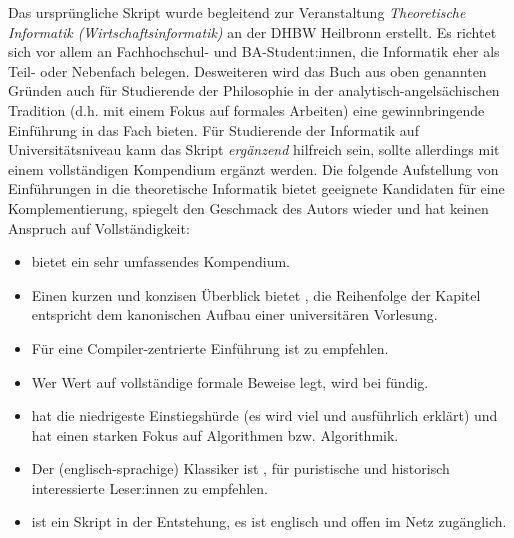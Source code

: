 Das ursprüngliche Skript wurde begleitend zur Veranstaltung
\emph{Theoretische Informatik (Wirtschaftsinformatik)}
an der DHBW Heilbronn erstellt.
Es richtet sich vor allem an Fachhochschul- und BA-Student:innen,
die Informatik eher als Teil- oder Nebenfach belegen.
Desweiteren wird das Buch aus oben genannten Gründen auch für Studierende der Philosophie
in der analytisch-angelsächischen Tradition (d.h. mit einem Fokus auf formales Arbeiten)
eine gewinnbringende Einführung in das Fach bieten.
Für Studierende der Informatik auf Universitätsniveau kann das Skript 
\emph{ergänzend} hilfreich sein,
sollte allerdings mit einem vollständigen Kompendium ergänzt werden.
Die folgende Aufstellung von Einführungen in die theoretische Informatik
bietet geeignete Kandidaten für eine Komplementierung, 
spiegelt den Geschmack des Autors wieder
und hat keinen Anspruch auf Vollständigkeit:
\begin{itemize}
    \item  \cite{hoffmann} bietet ein sehr umfassendes Kompendium.
    \item  Einen kurzen und konzisen Überblick bietet \cite{schoening},
            die Reihenfolge der Kapitel entspricht dem kanonischen Aufbau
            einer universitären Vorlesung.
    \item  Für eine Compiler-zentrierte Einführung ist \cite{hedtstueck}
           zu empfehlen.
    \item  Wer Wert auf vollständige formale Beweise legt,
        wird bei \cite{erkpriese} fündig.
    \item  \cite{neubert} hat die niedrigeste Einstiegshürde (es wird viel und ausführlich erklärt) und hat einen starken Fokus auf Algorithmen bzw. Algorithmik.
    \item  Der (englisch-sprachige) Klassiker ist \cite{hopcroftullman},
        für puristische und historisch interessierte Leser:innen zu empfehlen.
    \item  \cite{barak} ist ein Skript in der Entstehung, es ist englisch und offen im Netz zugänglich.
\end{itemize}



